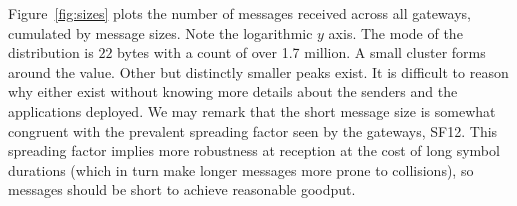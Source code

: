Figure~\ref{fig:sizes} plots the number of messages received across
all gateways, cumulated by message sizes. Note the logarithmic $y$ axis.
The mode of the distribution is $22$ bytes with a count of over 1.7 million.
A small cluster forms around the value.
Other but distinctly smaller peaks exist. It is difficult to
reason why either exist without knowing more details about the
senders and the applications deployed.
We may remark that the short message size is somewhat congruent
with the prevalent spreading factor seen by the gateways, SF12.
This spreading factor implies more robustness at reception at the
cost of long symbol durations (which in turn make longer messages
more prone to collisions), so messages should be short to achieve
reasonable goodput.
